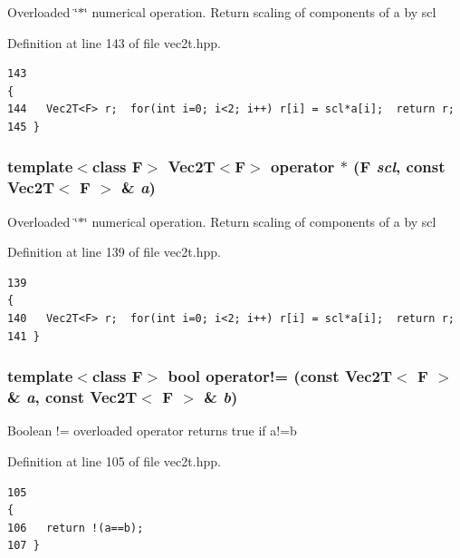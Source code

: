 Overloaded \char`\"{}$\ast$\char`\"{} numerical operation. Return scaling of components of a by scl 

Definition at line 143 of file vec2t.hpp.

\footnotesize\begin{verbatim}143                                                                         {
144   Vec2T<F> r;  for(int i=0; i<2; i++) r[i] = scl*a[i];  return r;
145 }
\end{verbatim}\normalsize 


\subsubsection{\setlength{\rightskip}{0pt plus 5cm}template$<$class F$>$ {\bf Vec2T}$<$F$>$ operator $\ast$ (F {\em scl}, const {\bf Vec2T}$<$ F $>$ \& {\em a})\hspace{0.3cm}{\tt  [inline]}}\label{vec2t_8hpp_4add347144946fe9ec79c551787ef896_4add347144946fe9ec79c551787ef896}


Overloaded \char`\"{}$\ast$\char`\"{} numerical operation. Return scaling of components of a by scl 

Definition at line 139 of file vec2t.hpp.

\footnotesize\begin{verbatim}139                                                                         {
140   Vec2T<F> r;  for(int i=0; i<2; i++) r[i] = scl*a[i];  return r;
141 }
\end{verbatim}\normalsize 


\subsubsection{\setlength{\rightskip}{0pt plus 5cm}template$<$class F$>$ bool operator!= (const {\bf Vec2T}$<$ F $>$ \& {\em a}, const {\bf Vec2T}$<$ F $>$ \& {\em b})\hspace{0.3cm}{\tt  [inline]}}\label{vec2t_8hpp_f25ba749daa99b10ac77224af19697a3_f25ba749daa99b10ac77224af19697a3}


Boolean != overloaded operator returns true if a!=b 

Definition at line 105 of file vec2t.hpp.

\footnotesize\begin{verbatim}105                                                                                 {
106   return !(a==b);
107 }
\end{verbatim}\normalsize 


